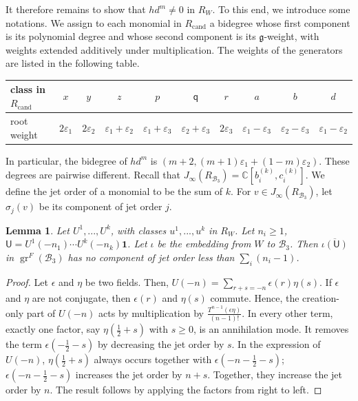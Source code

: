 \documentclass[11pt]{amsart}
\newtheorem{lemma}[theorem]{Lemma}
\theoremstyle{definition}
\theoremstyle{remark}
\DeclareMathOperator{\gr}{gr}
\newcommand{\B}{\mathcal B}
\begin{document}
It therefore remains to show that $hd^m\neq 0$ in $R_W$. To this end, we introduce some notations. We assign to each monomial in $R_{\mathrm{cand}}$ a bidegree whose first component is its polynomial degree and whose second component is its $\mathfrak{g}$-weight, with weights extended additively under multiplication. The weights of the generators are listed in the following table. 
\begin{table}[ht]
\centering\small\setlength{\tabcolsep}{4pt}
\label{tab:classes}
\begin{tabular}{l*{9}{c}}
\toprule
class in $R_{\mathrm{cand}}$ & $x$ & $y$ & $z$ & $p$ & $\mathsf{q}$ & $r$ & $a$ & $b$ & $d$\\
\midrule
root weight & $2\varepsilon_1$ & $2\varepsilon_2$ & $\varepsilon_1{+}\varepsilon_2$ & $\varepsilon_1{+}\varepsilon_3$
            & $\varepsilon_2{+}\varepsilon_3$ & $2\varepsilon_3$ & $\varepsilon_1{-}\varepsilon_3$
            & $\varepsilon_2{-}\varepsilon_3$ & $\varepsilon_1{-}\varepsilon_2$\\
\bottomrule
\end{tabular}
\end{table}
In particular, the bidegree of $hd^m$ is $(m+2,(m+1)\varepsilon_1+(1-m)\varepsilon_2)$. These degrees are pairwise different. Recall that $J_\infty(R_{\B_3})=\mathbb{C}[b_i^{(k)}, c_i^{(k)}]$. We define the jet order of a monomial to be the sum of $k$. For $v\in J_\infty(R_{\B_3})$, let $\sigma_j(v)$ be its component of jet order $j$. 
\begin{lemma}\label{lem:freefield}
Let $U^1,..., U^k$, with classes $u^1,...,u^k$ in $R_W$. Let $n_i\geq 1$, $\mathsf U=U^1(-n_1)\cdots U^k(-n_k)\mathbf 1$. Let $\iota$ be the embedding from $W$ to $\B_3$. Then $\overline{\iota(\mathsf{U})}$ in $\gr^F(\B_3)$ has no component of jet order less than $\sum_i(n_i-1)$.
\end{lemma}
\begin{proof}
Let $\epsilon$ and $\eta$ be two fields. Then, $U(-n)=\sum_{r+s=-n}\epsilon(r)\eta(s)$. If $\epsilon$ and $\eta$ are not conjugate, then $\epsilon(r)$ and $\eta(s)$ commute. Hence, the creation-only part of $U(-n)$ acts by multiplication by  $\frac{T^{n-1}(\epsilon \eta)}{(n-1)!}$. In every other term, exactly one factor, say $\eta(\frac12 + s)$ with $s\geq 0$, is an annihilation mode. It removes the term $\epsilon(-\frac12-s)$ by decreasing the jet order by $s$. In the expression of $U(-n)$, $\eta(\frac12+s)$ always occurs together with $\epsilon(-n-\frac12-s)$; $\epsilon(-n-\frac12-s)$ increases the jet order by $n+s$. Together, they increase the jet order by $n$. The result follows by applying the factors from right to left. 
\end{proof}
\end{document}
